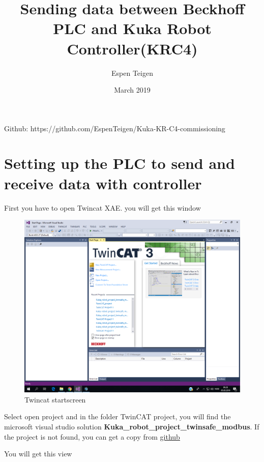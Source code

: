 \documentclass{article}
\title{Sending data between Beckhoff PLC and Kuka Robot Controller(KRC4)}
\author{Espen Teigen }
\date{March 2019}
\begin{document}
\maketitle

    Github: https://github.com/EspenTeigen/Kuka-KR-C4-commissioning

\newpage
\section{Setting up the PLC to send and receive data with controller}
First you have to open Twincat XAE. you will get this window

\begin{figure}[!h]
    \centering
    \includegraphics[width=\textwidth]{pictures/TC3_startscreen.png}
    \caption{Twincat startscreen}
    \label{fig:my_label}
\end{figure}

Select open project and in the folder TwinCAT project, you will find the microsoft visual studio solution \textbf{Kuka\_robot\_project\_twinsafe\_modbus}. If the project is not found, you can get a copy from \href{https://github.com/EspenTeigen/Kuka-KR-C4-commissioning}{\underline{github}}

\newpage
You will get this view
\end{document}
